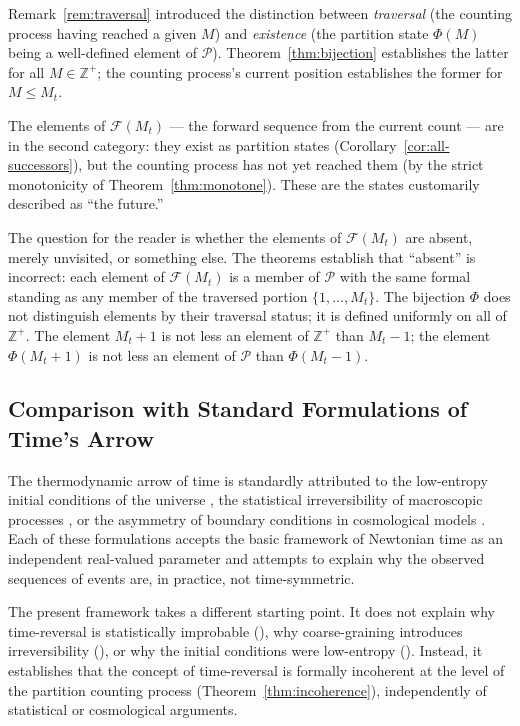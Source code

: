 \documentclass[twocolumn,10pt,a4paper]{article}
\theoremstyle{thmstyle}
\theoremstyle{definition}
\theoremstyle{remark}
\newcommand{\Zp}{\mathbb{Z}^{+}}
\newcommand{\Parts}{\mathcal{P}}
\newcommand{\PhiMap}{\varPhi}
\begin{document}
Remark~\ref{rem:traversal} introduced the distinction between \emph{traversal} (the counting process having reached a given $M$) and \emph{existence} (the partition state $\PhiMap(M)$ being a well-defined element of $\Parts$). Theorem~\ref{thm:bijection} establishes the latter for all $M \in \Zp$; the counting process's current position establishes the former for $M \leq M_t$.

The elements of $\mathcal{F}(M_t)$ --- the forward sequence from the current count --- are in the second category: they exist as partition states (Corollary~\ref{cor:all-successors}), but the counting process has not yet reached them (by the strict monotonicity of Theorem~\ref{thm:monotone}). These are the states customarily described as ``the future.''

The question for the reader is whether the elements of $\mathcal{F}(M_t)$ are absent, merely unvisited, or something else. The theorems establish that ``absent'' is incorrect: each element of $\mathcal{F}(M_t)$ is a member of $\Parts$ with the same formal standing as any member of the traversed portion $\{1, \ldots, M_t\}$. The bijection $\PhiMap$ does not distinguish elements by their traversal status; it is defined uniformly on all of $\Zp$. The element $M_t + 1$ is not less an element of $\Zp$ than $M_t - 1$; the element $\PhiMap(M_t + 1)$ is not less an element of $\Parts$ than $\PhiMap(M_t - 1)$.

\subsection{Comparison with Standard Formulations of Time's Arrow}

The thermodynamic arrow of time is standardly attributed to the low-entropy initial conditions of the universe \citep{penrose1979,penrose2004}, the statistical irreversibility of macroscopic processes \citep{boltzmann1877,boltzmann1896}, or the asymmetry of boundary conditions in cosmological models \citep{hawking1985,reichenbach1956}. Each of these formulations accepts the basic framework of Newtonian time as an independent real-valued parameter and attempts to explain why the observed sequences of events are, in practice, not time-symmetric.

The present framework takes a different starting point. It does not explain why time-reversal is statistically improbable (\citealt{boltzmann1877}), why coarse-graining introduces irreversibility (\citealt{gibbs1902}), or why the initial conditions were low-entropy (\citealt{penrose2004}). Instead, it establishes that the concept of time-reversal is formally incoherent at the level of the partition counting process (Theorem~\ref{thm:incoherence}), independently of statistical or cosmological arguments.
\end{document}
